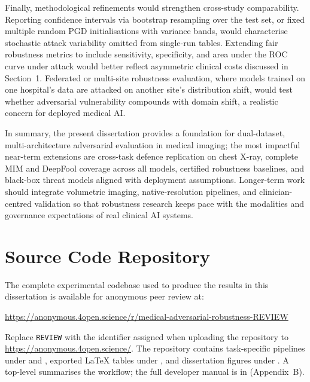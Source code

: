 \documentclass[12pt,a4paper,oneside]{report}
\begin{document}
Finally, methodological refinements would strengthen cross-study comparability. Reporting confidence intervals via bootstrap resampling over the test set, or fixed multiple random PGD initialisations with variance bands, would characterise stochastic attack variability omitted from single-run tables. Extending fair robustness metrics to include sensitivity, specificity, and area under the ROC curve under attack would better reflect asymmetric clinical costs discussed in Section~1. Federated or multi-site robustness evaluation, where models trained on one hospital's data are attacked on another site's distribution shift, would test whether adversarial vulnerability compounds with domain shift, a realistic concern for deployed medical AI.

In summary, the present dissertation provides a foundation for dual-dataset, multi-architecture adversarial evaluation in medical imaging; the most impactful near-term extensions are cross-task defence replication on chest X-ray, complete MIM and DeepFool coverage across all models, certified robustness baselines, and black-box threat models aligned with deployment assumptions. Longer-term work should integrate volumetric imaging, native-resolution pipelines, and clinician-centred validation so that robustness research keeps pace with the modalities and governance expectations of real clinical AI systems.

\appendix

\chapter{Source Code Repository}
\label{app:repository}

The complete experimental codebase used to produce the results in this dissertation is available for anonymous peer review at:
\begin{center}
  \url{https://anonymous.4open.science/r/medical-adversarial-robustness-REVIEW}
\end{center}
\noindent
Replace \texttt{REVIEW} with the identifier assigned when uploading the repository to \url{https://anonymous.4open.science/}. The repository contains task-specific pipelines under  and , exported LaTeX tables under , and dissertation figures under . A top-level  summarises the workflow; the full developer manual is in  (Appendix~B).
\end{document}
